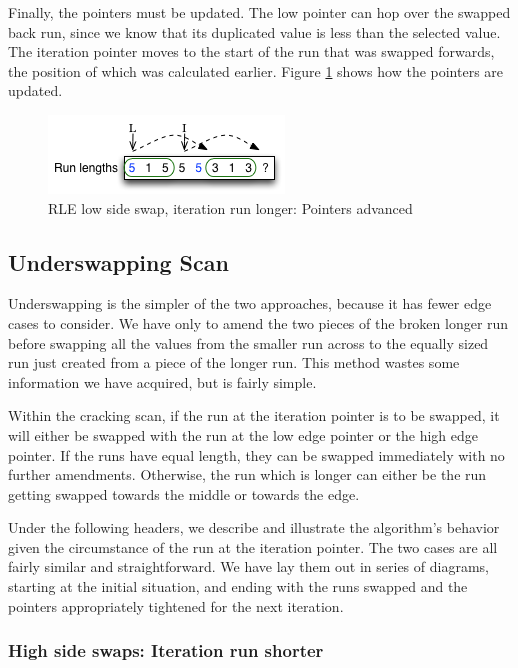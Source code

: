Finally, the pointers must be updated. The low pointer can hop over the swapped back run, since we know that its duplicated value is less than the selected value. The iteration pointer moves to the start of the run that was swapped forwards, the position of which was calculated earlier. Figure \ref{fig:rle_lowside_2d} shows how the pointers are updated.

\begin{figure}[H]
  \centering
  \includegraphics[]{images/d15_rle_lowside_2d}
  \caption{RLE low side swap, iteration run longer: Pointers advanced}
  \label{fig:rle_lowside_2d}
\end{figure}

\subsection{Underswapping Scan}

Underswapping is the simpler of the two approaches, because it has fewer edge cases to consider. We have only to amend the two pieces of the broken longer run before swapping all the values from the smaller run across to the equally sized run just created from a piece of the longer run. This method wastes some information we have acquired, but is fairly simple.

Within the cracking scan, if the run at the iteration pointer is to be swapped, it will either be swapped with the run at the low edge pointer or the high edge pointer. If the runs have equal length, they can be swapped immediately with no further amendments. Otherwise, the run which is longer can either be the run getting swapped towards the middle or towards the edge.

Under the following headers, we describe and illustrate the algorithm's behavior given the circumstance of the run at the iteration pointer. The two cases are all fairly similar and straightforward. We have lay them out in series of diagrams, starting at the initial situation, and ending with the runs swapped and the pointers appropriately tightened for the next iteration.

\subsubsection{High side swaps: Iteration run shorter}

